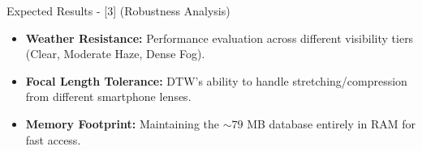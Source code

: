 \begin{frame}{Expected Results - [3] (Robustness Analysis)}
    \begin{itemize}
        \item \textbf{Weather Resistance:} Performance evaluation across different visibility tiers (Clear, Moderate Haze, Dense Fog).
        \item \textbf{Focal Length Tolerance:} DTW's ability to handle stretching/compression from different smartphone lenses.
        \item \textbf{Memory Footprint:} Maintaining the $\sim 79$ MB database entirely in RAM for fast access.
    \end{itemize}
\end{frame}
